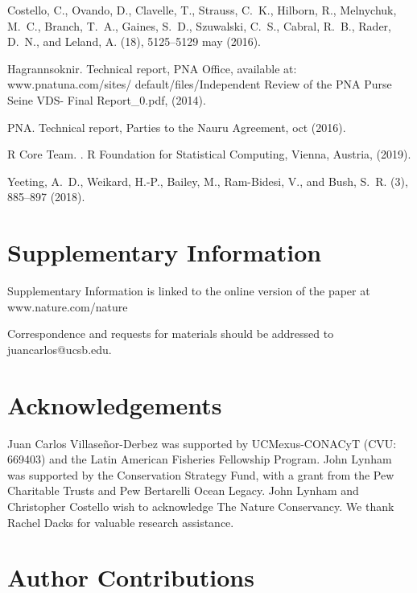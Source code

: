 \documentclass[12pt]{article}
\begin{document}
\begin{thebibliography}{10}
Costello, C., Ovando, D., Clavelle, T., Strauss, C.~K., Hilborn, R., Melnychuk,
  M.~C., Branch, T.~A., Gaines, S.~D., Szuwalski, C.~S., Cabral, R.~B., Rader,
  D.~N., and Leland, A.
(18), 5125--5129 may  (2016).

Hagrannsoknir.
\newblock Technical report, PNA Office, available at: www.pnatuna.com/sites/
  default/files/Independent Review of the PNA Purse Seine VDS- Final Report_0.pdf,  (2014).

PNA.
\newblock Technical report, Parties to the Nauru Agreement,  oct  (2016).

{R Core Team}.
.
\newblock R Foundation for Statistical Computing, Vienna, Austria,  (2019).

Yeeting, A.~D., Weikard, H.-P., Bailey, M., Ram-Bidesi, V., and Bush, S.~R.
(3), 885--897 (2018).

\end{thebibliography}


\section{Supplementary Information}

Supplementary Information is linked to the online version of the paper at www.nature.com/nature


Correspondence and requests for materials should be addressed to juancarlos@ucsb.edu.

\section{Acknowledgements}

Juan Carlos Villaseñor-Derbez was supported by UCMexus-CONACyT (CVU: 669403) and the Latin American Fisheries Fellowship Program. John Lynham was supported by the Conservation Strategy Fund, with a grant from the Pew Charitable Trusts and Pew Bertarelli Ocean Legacy. John Lynham and Christopher Costello wish to acknowledge The Nature Conservancy. We thank Rachel Dacks for valuable research assistance.

\section{Author Contributions}
\end{document}
